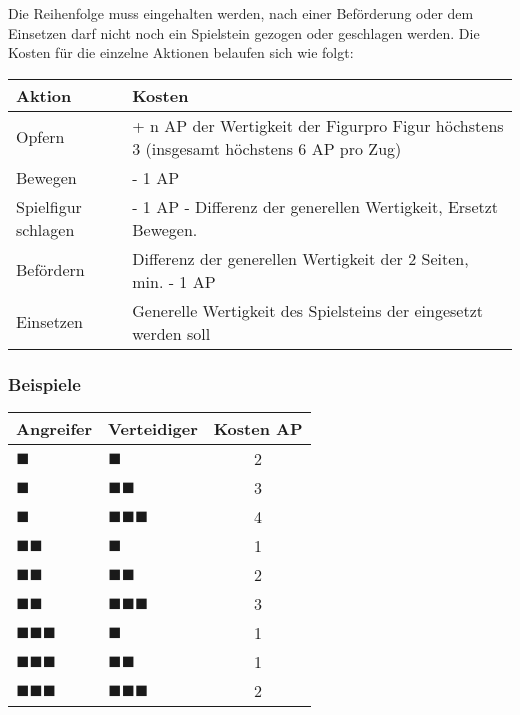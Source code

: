 \documentclass{article}
\begin{document}
	\begin{flushleft}
	Die Reihenfolge muss eingehalten werden, nach einer Beförderung oder dem Einsetzen darf nicht noch ein 
	Spielstein gezogen oder geschlagen werden.
	Die Kosten für die einzelne Aktionen belaufen sich wie folgt:
	\end{flushleft}

	\begin{tabular}{lp{10cm}}
	\hline
	Aktion & 
		Kosten \\ \hline
	Opfern & 
		+ n AP der Wertigkeit der Figur\newline pro Figur höchstens 3 (insgesamt höchstens 6 AP pro Zug) \\
	Bewegen & 
		- 1 AP \\
	Spielfigur schlagen & 
		- 1 AP - Differenz der generellen Wertigkeit, Ersetzt Bewegen. \\
	Befördern & 
		Differenz der generellen Wertigkeit der 2 Seiten, min. - 1 AP \\
	Einsetzen & 
		Generelle Wertigkeit des Spielsteins der eingesetzt werden soll \\ \hline
	\end{tabular} 
	
	\subsubsection*{Beispiele}
	
	\begin{tabular}{llc}
	Angreifer & Verteidiger & Kosten AP \\ \hline 
	$\blacksquare$ & $\blacksquare$ & 2 \\
	$\blacksquare$ & $\blacksquare\blacksquare$ & 3 \\
	$\blacksquare$ & $\blacksquare\blacksquare\blacksquare$ & 4 \\
	
	$\blacksquare\blacksquare$ & $\blacksquare$ & 1 \\ 
	$\blacksquare\blacksquare$ & $\blacksquare\blacksquare$ & 2 \\ 
	$\blacksquare\blacksquare$ & $\blacksquare\blacksquare\blacksquare$ & 3 \\ 
	
	$\blacksquare\blacksquare\blacksquare$ & $\blacksquare$ & 1 \\ 
	$\blacksquare\blacksquare\blacksquare$ & $\blacksquare\blacksquare$ & 1 \\ 
	$\blacksquare\blacksquare\blacksquare$ & $\blacksquare\blacksquare\blacksquare$ & 2 \\ 
	\end{tabular} 
	
\end{document}
